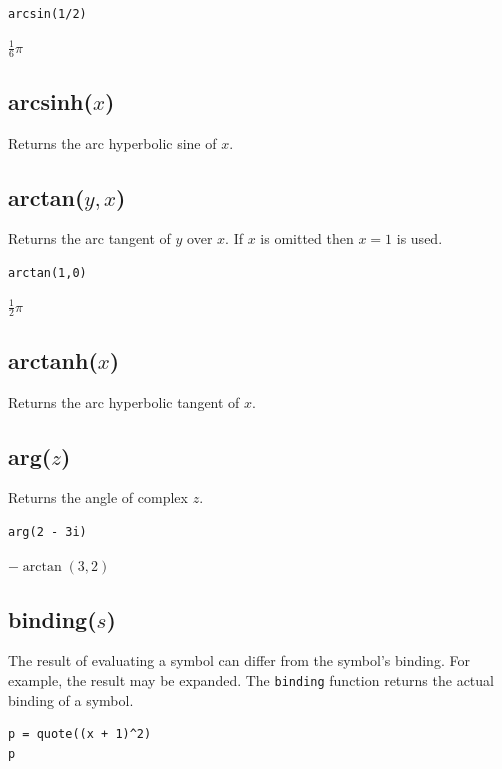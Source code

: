 \documentclass[12pt]{article}
\begin{document}
{\color{blue}
\begin{verbatim}
arcsin(1/2)
\end{verbatim}
}

\noindent
$\tfrac{1}{6}\pi$

\subsection*{arcsinh($x$)}

Returns the arc hyperbolic sine of $x$.

\subsection*{arctan($y,x$)}

Returns the arc tangent of $y$ over $x$.
If $x$ is omitted then $x=1$ is used.

{\color{blue}
\begin{verbatim}
arctan(1,0)
\end{verbatim}
}

\noindent
$\tfrac{1}{2}\pi$

\subsection*{arctanh($x$)}

Returns the arc hyperbolic tangent of $x$.

\subsection*{arg($z$)}

Returns the angle of complex $z$.

{\color{blue}
\begin{verbatim}
arg(2 - 3i)
\end{verbatim}
}

\noindent
$-\arctan(3,2)$

\subsection*{binding($s$)}

The result of evaluating a symbol can differ from the symbol's binding.
For example, the result may be expanded.
The {\tt binding} function returns the actual binding of a symbol.

{\color{blue}
\begin{verbatim}
p = quote((x + 1)^2)
p
\end{verbatim}
}
\end{document}
